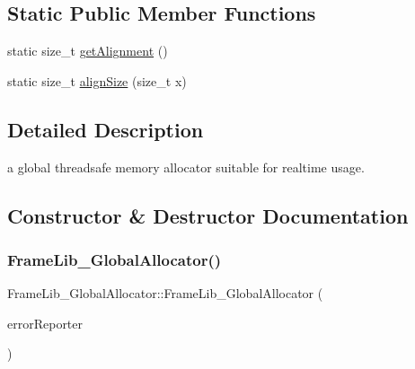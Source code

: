 \subsection*{Static Public Member Functions}
\begin{DoxyCompactItemize}
\item 
static size\+\_\+t \hyperlink{class_frame_lib___global_allocator_aebae4f9f17b2d460f7d27e2a68eb9ae8}{get\+Alignment} ()
\item 
static size\+\_\+t \hyperlink{class_frame_lib___global_allocator_a5568abfa871845e293c76e76a891b2ef}{align\+Size} (size\+\_\+t x)
\end{DoxyCompactItemize}


\subsection{Detailed Description}
a global threadsafe memory allocator suitable for realtime usage. 

\subsection{Constructor \& Destructor Documentation}
\mbox{\label{class_frame_lib___global_allocator_aeb0d7259cd6bb4c5b8e365a26e370e54}} 
\subsubsection{\texorpdfstring{Frame\+Lib\+\_\+\+Global\+Allocator()}{FrameLib\_GlobalAllocator()}\hspace{0.1cm}{\footnotesize\ttfamily [1/2]}}
{\footnotesize\ttfamily Frame\+Lib\+\_\+\+Global\+Allocator\+::\+Frame\+Lib\+\_\+\+Global\+Allocator (\begin{DoxyParamCaption}\item[{\hyperlink{class_frame_lib___error_reporter}{Frame\+Lib\+\_\+\+Error\+Reporter} \&}]{error\+Reporter }\end{DoxyParamCaption})\hspace{0.3cm}{\ttfamily [inline]}}

\mbox{\label{class_frame_lib___global_allocator_a20fa9b3b84bb54eefffb8f30a70883d5}} 
